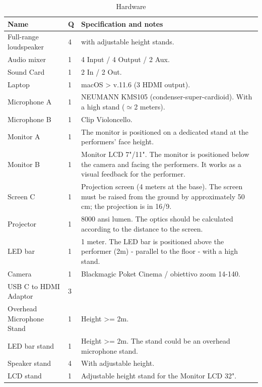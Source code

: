 \begin{longtable}{|p{}|p{}|p{}|}
    \caption{Hardware} \label{tab:a-data-hardware} \\
    \hline
    \textbf{Name} & \textbf{Q} & \textbf{Specification and notes} \\
    \hline
    Full-range loudspeaker & 4 & \scriptsize with adjustable height stands. \\
    \hline
    Audio mixer & 1 & \scriptsize 4 Input / 4 Output / 2 Aux. \\
    \hline
    Sound Card & 1 & \scriptsize 2 In / 2 Out. \\
    \hline
    Laptop & 1 & \scriptsize macOS > v.11.6 (3 HDMI output). \\
    \hline
    Microphone A & 1 & \scriptsize NEUMANN KMS105 (condenser-super-cardioid). With a high stand ($\simeq$2 meters). \\
    \hline
    Microphone B & 1 & \scriptsize Clip Violoncello. \\
    \hline
    Monitor A & 1 & \scriptsize The monitor is positioned on a dedicated stand at the performers' face height.\\
    \hline
    Monitor B & 1 & \scriptsize Monitor LCD 7"/11". The monitor is positioned below the camera and facing the performers. It works as a visual feedback for the performer.\\
    \hline
    Screen C & 1 & \scriptsize Projection screen (4 meters at the base). The screen must be raised from the ground by approximately 50 cm; the projection is in 16/9.\\
    \hline
    Projector & 1 & \scriptsize 8000 ansi lumen. The optics should be calculated according to the distance to the screen.\\
    \hline
    LED bar & 1 & \scriptsize 1 meter. The LED bar is positioned above the performer (2m) - parallel to the floor - with a high stand.\\
    \hline
    Camera & 1 & \scriptsize Blackmagic Poket Cinema / obiettivo zoom 14-140.\\
    \hline
    USB C to HDMI Adaptor & 3 & \scriptsize \\
    \hline
    Overhead Microphone Stand & 1 & \scriptsize Height >= 2m.\\
    \hline
    LED bar stand  & 1 & \scriptsize Height >= 2m. The stand could be an overhead microphone stand. \\
    \hline
    Speaker stand   & 4 & \scriptsize With adjustable height.\\
    \hline
    LCD stand & 1 & \scriptsize Adjustable height stand for the Monitor LCD 32".\\
    \hline
\end{longtable}

